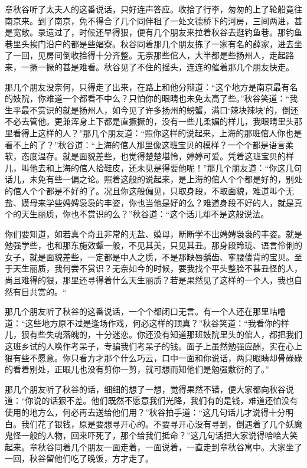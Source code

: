 \documentclass[12pt,UTF8]{ctexbook}
\begin{document}
{{{章秋谷听了太夫人的这番说话，只好连声答应。收拾了行李，匆匆的上了轮船竟往南京来。到了南京，免不得合了几个同伴租了一处文德桥下的河房，三间两进，甚是宽敞。录遗过了，时候还早得狠，便有几个朋友来拉着秋谷去逛钓鱼巷。那钓鱼巷里头挨门沿户的都是些娼寮。秋谷同着那几个朋友拣了一家有名的薛家，进去坐了一回，见房间倒收拾得十分齐整。无奈那些倌人，大半都是些扬州人，走起路来，一撅一撅的甚是难看。秋谷见了不住的摇头，连连的催着那几个朋友快走。

那几个朋友没奈何，只得走了出来，在路上和他分辩道：“这个地方是南京最有名的妓院，你难道一个都看不中么？只怕你的眼睛也未免太高了些。”秋谷笑道：“我生平最不赏识的就是扬州人，如今见了许多扬州的螃蟹，满口‘辣块辣块’的，倒还不必去管他。更兼浑身上下都是直撅撅的，没有一些儿柔媚的样儿，我眼睛里头那里看得上这样的人？”那几个朋友道：“照你这样的说起来，上海的那班倌人你也是看不上的了？”秋谷道：“上海的倌人那里像这班宝贝的模样？一个个都是语言柔软，态度温存。就是面貌差些，也觉得楚楚堪怜，婷婷可爱。凭着这班宝贝的样儿，叫他去和上海的倌人拾鞋皮，还未见是得要他呢！”那几个朋友道：“你这几句话儿，未免有些一偏之论。照着这般的说起来，是上海的倌人个个都是好的，别处的倌人个个都是不好的了。况且你这般偏见，只取身段，不取面貌，难道叫个无盐、嫫母来学些娉娉袅袅的丰姿，你也当他是好的么？难道身段不好的人，就是真个的天生丽质，你也不赏识的么？”秋谷道：“这个话儿却不是这般说法。

你们要知道，如若真个奇丑非常的无盐、嫫母，断断学不出娉娉袅袅的丰姿。就是勉强学些，也和那东施效颦一般，不见其美，只见其丑。那身段玲珑、语言伶俐的女子，就是面貌差些，一定都是中人之质，不是那缺唇龋齿、挛腰偻背的宝贝。至于天生丽质，我何尝不赏识？无奈如今的时候，要我找个平头整脸不甚丑怪的人，尚且难得的狠，那里还寻得着什么天生丽质？若是果然见了这样的一个人，我也自然有目共赏的。“

那几个朋友听了秋谷的这番说话，一个个都闭口无言。有一个人还在那里咕噜道：“这些地方原不过是逢场作戏，何必这样的顶真？”秋谷笑道：“我看你的样儿，狠有些失魂落魄的，十分迷恋。你还没有知道那班妓院里头的倌人，都把我们这班乡试的人唤作考呆子，专骗我们考呆子的钱。面子上虽然勉强应酬，实在心上狠有些不愿意。你只看方才那个什么巧云，口中一面和你说话，两只眼睛却骨碌碌的看着别处，正眼儿也没有剪你一剪，就可想而知他们是勉强敷衍的了。”

那几个朋友听了秋谷的话，细细的想了一想，觉得果然不错，便大家都向秋谷说道：“你说的话狠不差。他们既然不愿意我们光降，我们有的是钱，难道还怕没有使用的地方么，何必再去送给他们用？”秋谷拍手道：“这几句话儿才说得十分明白。我们花了银钱，原是要想寻开心的。不要寻开心没有寻到，倒遇着了几个妖魔鬼怪一般的人物，回来吓死了，那个给我们抵命？”这几句话把大家说得哈哈大笑起来。章秋谷同着几个朋友一面走着，一面说着，一直走到章秋谷寓中。大家坐了一回，秋谷留他们吃了晚饭，方才走了。

}}}
\end{document}
